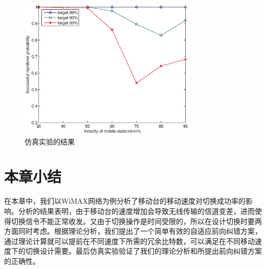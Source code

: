 \begin{figure}[t]
\begin{centering}
\includegraphics[height=6.75cm]{iccs_speed_prob_simu}
\caption{仿真实验的结果}
\label{fig:chap_iccs_results}
\end{centering}
\end{figure}

\section{本章小结}
在本章中，我们以WiMAX网络为例分析了移动台的移动速度对切换成功率的影响。分析的结果表明，由于移动台的速度增加会导致无线传输的信道变差，进而使得切换信令不能正常收发。又由于切换操作是时间受限的，所以在设计切换时要两方面同时考虑。根据理论分析，我们提出了一个简单有效的自适应前向纠错方案，通过理论计算就可以提前在不同速度下所需的冗余比特数，可以满足在不同移动速度下的切换设计需要。最后仿真实验验证了我们的理论分析和所提出前向纠错方案的正确性。
